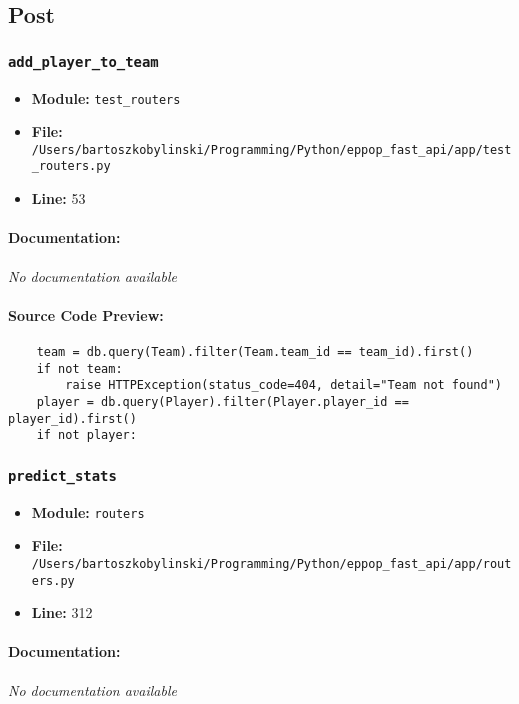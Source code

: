 \documentclass[11pt,a4paper]{article}
\begin{document}
\vspace{1em}
\subsection{Post}

\subsubsection{\texttt{add\_player\_to\_team}}

\begin{itemize}
    \item \textbf{Module:} \texttt{test\_routers}
    \item \textbf{File:} \texttt{/Users/bartoszkobylinski/Programming/Python/eppop\_fast\_api/app/test\_routers.py}
    \item \textbf{Line:} 53
\end{itemize}

\paragraph{Documentation:} \textit{No documentation available}

\paragraph{Source Code Preview:}
\begin{verbatim}
    team = db.query(Team).filter(Team.team_id == team_id).first()
    if not team:
        raise HTTPException(status_code=404, detail="Team not found")
    player = db.query(Player).filter(Player.player_id == player_id).first()
    if not player:
\end{verbatim}

\vspace{1em}
\subsubsection{\texttt{predict\_stats}}

\begin{itemize}
    \item \textbf{Module:} \texttt{routers}
    \item \textbf{File:} \texttt{/Users/bartoszkobylinski/Programming/Python/eppop\_fast\_api/app/routers.py}
    \item \textbf{Line:} 312
\end{itemize}

\paragraph{Documentation:} \textit{No documentation available}
\end{document}
